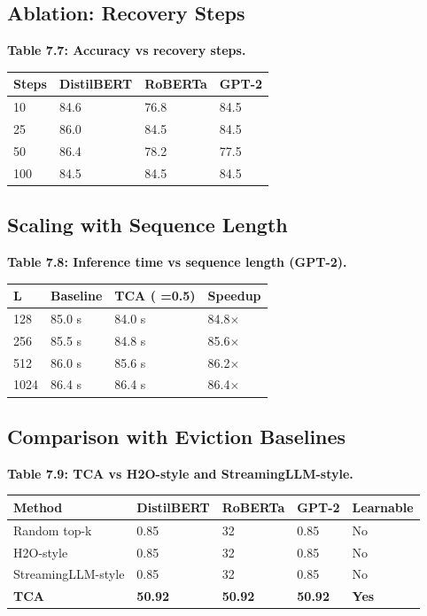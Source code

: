 \subsection{Ablation: Recovery Steps}

\textbf{Table 7.7: Accuracy vs recovery steps.}

\begin{table}[H]
\centering
\small
\begin{tabular}{llll}
\toprule
\textbf{Steps} & \textbf{DistilBERT} & \textbf{RoBERTa} & \textbf{GPT-2} \\
\midrule
10 & 84.6 & 76.8 & 84.5 \\
25 & 86.0 & 84.5 & 84.5 \\
50 & 86.4 & 78.2 & 77.5 \\
100 & 84.5 & 84.5 & 84.5 \\
\bottomrule
\end{tabular}
\end{table}

\subsection{Scaling with Sequence Length}

\textbf{Table 7.8: Inference time vs sequence length (GPT-2).}

\begin{table}[H]
\centering
\small
\begin{tabular}{llll}
\toprule
\textbf{L} & \textbf{Baseline} & \textbf{TCA ( =0.5)} & \textbf{Speedup} \\
\midrule
128 & 85.0 s & 84.0 s & 84.8$\times$ \\
256 & 85.5 s & 84.8 s & 85.6$\times$ \\
512 & 86.0 s & 85.6 s & 86.2$\times$ \\
1024 & 86.4 s & 86.4 s & 86.4$\times$ \\
\bottomrule
\end{tabular}
\end{table}

\subsection{Comparison with Eviction Baselines}

\textbf{Table 7.9: TCA vs H2O-style and StreamingLLM-style.}

\begin{table}[H]
\centering
\small
\begin{tabular}{lllll}
\toprule
\textbf{Method} & \textbf{DistilBERT} & \textbf{RoBERTa} & \textbf{GPT-2} & \textbf{Learnable} \\
\midrule
Random top-k & 0.85 & 32 & 0.85 & No \\
H2O-style & 0.85 & 32 & 0.85 & No \\
StreamingLLM-style & 0.85 & 32 & 0.85 & No \\
\textbf{TCA} & \textbf{50.92} & \textbf{50.92} & \textbf{50.92} & \textbf{Yes} \\
\bottomrule
\end{tabular}
\end{table}

